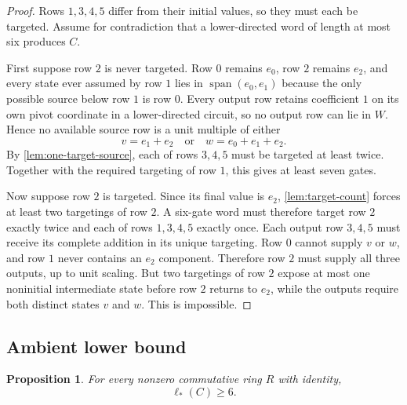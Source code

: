 \documentclass[11pt]{amsart}
\numberwithin{equation}{section}
\newtheorem{proposition}[theorem]{Proposition}
\theoremstyle{definition}
\theoremstyle{remark}
\newcommand{\Span}{\operatorname{span}}
\newcommand{\ellAll}{\ell_{*}}
\begin{document}
\begin{proof}
Rows $1,3,4,5$ differ from their initial values, so they must each be targeted.  Assume for contradiction that a lower-directed word of length at most six produces $C$.

First suppose row $2$ is never targeted.  Row $0$ remains $e_0$, row $2$ remains $e_2$, and every state ever assumed by row $1$ lies in $\Span(e_0,e_1)$ because the only possible source below row $1$ is row $0$.  Every output row retains coefficient $1$ on its own pivot coordinate in a lower-directed circuit, so no output row can lie in $W$.  Hence no available source row is a unit multiple of either
\[
v=e_1+e_2
\quad\text{or}\quad
w=e_0+e_1+e_2.
\]
By \cref{lem:one-target-source}, each of rows $3,4,5$ must be targeted at least twice.  Together with the required targeting of row $1$, this gives at least seven gates.

Now suppose row $2$ is targeted.  Since its final value is $e_2$, \cref{lem:target-count} forces at least two targetings of row $2$.  A six-gate word must therefore target row $2$ exactly twice and each of rows $1,3,4,5$ exactly once.  Each output row $3,4,5$ must receive its complete addition in its unique targeting.  Row $0$ cannot supply $v$ or $w$, and row $1$ never contains an $e_2$ component.  Therefore row $2$ must supply all three outputs, up to unit scaling.  But two targetings of row $2$ expose at most one noninitial intermediate state before row $2$ returns to $e_2$, while the outputs require both distinct states $v$ and $w$.  This is impossible.
\end{proof}

\subsection{Ambient lower bound}

\begin{proposition}\label{prop:ambient-lower-bound}
For every nonzero commutative ring $R$ with identity,
\[
\ellAll(C)\ge6.
\]
\end{proposition}
\end{document}
